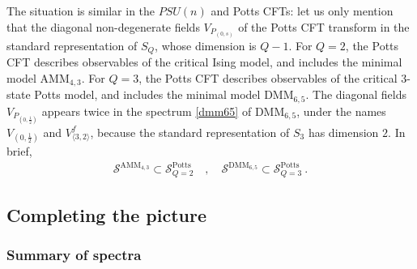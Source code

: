 \documentclass[12pt, a4paper]{article}
\begin{document}
The situation is similar in the $PSU(n)$ and Potts CFTs: let us only mention that the diagonal non-degenerate fields $V_{P_{(0,s)}}$ of the Potts CFT transform in the standard  representation of $S_Q$, whose dimension is $Q-1$. 
For $Q=2$, the Potts CFT describes observables of the critical Ising model, and includes the minimal model AMM$_{4,3}$. For $Q=3$, the Potts CFT describes observables of the critical 3-state Potts model, and includes the minimal model DMM$_{6,5}$. The diagonal fields $V_{P_{(0,\frac12)}}$ appears twice in the spectrum \eqref{dmm65} of DMM$_{6,5}$, under the names $V_{(0,\frac12)}$ and $V^f_{\langle 3,2\rangle}$, because the standard representation of $S_3$ has dimension $2$. In brief,
\begin{align}
 \mathcal{S}^{\text{AMM}_{4,3}}\subset \mathcal{S}^\text{Potts}_{Q=2} \quad , \quad \mathcal{S}^{\text{DMM}_{6,5}}\subset \mathcal{S}^\text{Potts}_{Q=3}\ .
\end{align}

\subsection{Completing the picture}

\subsubsection{Summary of spectra}
\end{document}
